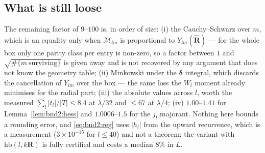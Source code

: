 \subsection{What is still loose}
\label{sec:bnd2:loose}

The remaining factor of $9$--$100$ is, in order of size: (i) the Cauchy--Schwarz over $m$,
which is an equality only when $\mathcal{M}_{lm}$ is proportional to $Y_{lm}(\hat{\mathbf
R})$ --- for the whole box only one parity class per entry is non-zero, so a factor between
$1$ and $\sqrt{\#\{m\ \mathrm{surviving}\}}$ is given away and is not recovered by any
argument that does not know the geometry table; (ii) Minkowski under the
$\boldsymbol{\delta}$ integral, which discards the cancellation of $Y_{lm}$ over the box
--- the same loss the $W_l$ moment already minimises for the radial part; (iii) the
absolute values across $l$, worth the measured $\sum_l|t_l|/|T| \le 8.4$ at $\lambda/32$
and $\le 67$ at $\lambda/4$; (iv) $1.00$--$1.41$ for Lemma~\ref{lem:bnd2:hess} and
$1.0006$--$1.5$ for the $j_l$ majorant. Nothing here bounds a rounding error, and
\eqref{eq:bnd2:reg} uses $|h_l|$ from the upward recurrence, which is a measurement
($3\times10^{-15}$ for $l \le 40$) and not a theorem; the variant with
$\mathrm{hb}(l,k\mathbf{R})$ is fully certified and costs a median $8\%$ in $L$.
